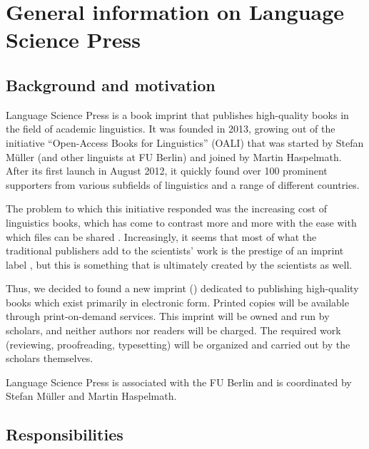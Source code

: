 \chapter{General information on Language Science Press}


\section{Background and motivation}

Language Science Press is a book imprint that publishes high-quality books in the field of academic linguistics. It was founded in 2013, growing out of the initiative ``Open-Access Books for Linguistics'' (OALI) that was started by Stefan Müller (and other linguists at FU Berlin) and joined by Martin Haspelmath. After its first launch in August 2012, it quickly found over 100 prominent supporters from various subfields of linguistics and a range of different countries.

The problem to which this initiative responded was the increasing cost of linguistics books, which has come to contrast more and more with the ease with which files can be shared \citep{MuellerOA}. Increasingly, it seems that most of what the traditional publishers add to the scientists' work is the prestige of an imprint label \citep{Haspelmath2012a}, but this is something that is ultimately created by the scientists as well.

Thus, we decided to found a new imprint (\lsp) dedicated to publishing high-quality books which exist primarily in electronic form. Printed copies will be available through print-on-demand services. This imprint will be owned and run by scholars, and neither authors nor readers will be charged. The required work (reviewing, proofreading, typesetting) will be organized and carried out by the scholars themselves.

Language Science Press is associated with the FU Berlin and is coordinated by Stefan Müller and Martin Haspelmath.




\section{Responsibilities}

